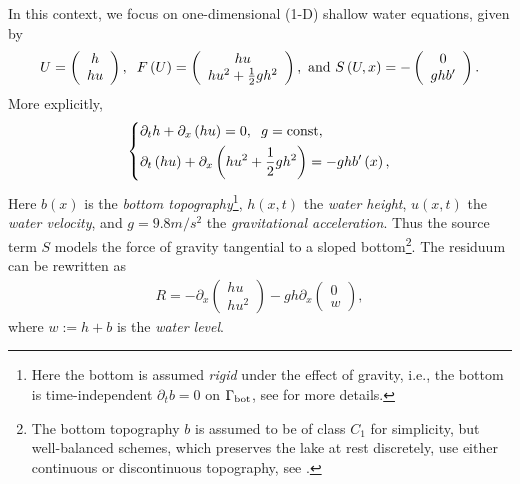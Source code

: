 \documentclass[11pt,a4paper,center,notitlepage]{article}
\numberwithin{equation}{section}
\begin{document}
In this context, we focus on one-dimensional (1-D) shallow water equations, given by 
\begin{align}
\label{1.4}
U = \left( {\begin{array}{*{20}{c}}
h\\
{hu}
\end{array}} \right), \hspace{2mm} F\left( U \right) = \left( {\begin{array}{*{20}{c}}
{hu}\\
{h{u^2} + \frac{1}{2}g{h^2}}
\end{array}} \right), \mbox{ and } S\left( {U,x} \right) =  - \left( {\begin{array}{*{20}{c}}
0\\
{ghb'}
\end{array}} \right).
\end{align}
More explicitly,
\begin{equation}
\label{1}
\left\{ \begin{split}
& {\partial _t}h + {\partial _x}\left( {hu} \right) = 0, \hspace{2mm} g = \mbox{const},\\
& {\partial _t}\left( {hu} \right) + {\partial _x}\left( {h{u^2} + {\frac{1}{2}g{h^2}}} \right) =  - ghb'\left(x\right),
\end{split} \right.
\end{equation}
Here $b\left(x\right)$ is the \textit{bottom topography}\footnote{Here the bottom is assumed \textit{rigid} under the effect of gravity, i.e., the bottom is time-independent $\partial _t b =0$ on $\Gamma _{\rm bot}$, see \cite[pp. 2--3]{Duchene2019} for more details.}, $h\left(x,t\right)$ the \textit{water height}, $u\left(x,t\right)$ the \textit{water velocity}, and $g=9.8m/s^2$ the \textit{gravitational acceleration}. Thus the source term $S$ models the force of gravity tangential to a sloped bottom\footnote{The bottom topography $b$ is assumed to be of class $C_1$ for simplicity, but well-balanced schemes, which preserves the lake at rest discretely, use either continuous or discontinuous topography, see \cite[p. 760]{Chen2017}.}. The residuum can be rewritten as 
\begin{align}
R =  - {\partial _x}\left( {\begin{array}{*{20}{c}}
{hu}\\
{h{u^2}}
\end{array}} \right) - gh{\partial _x}\left( {\begin{array}{*{20}{c}}
0\\
w
\end{array}} \right),
\end{align}
where $w:= h + b$ is the \textit{water level}. 
\end{document}
